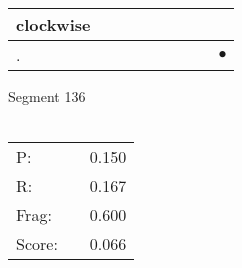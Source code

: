 \documentclass[landscape]{article}
\newcommand{\ssp}{\hspace{2pt}}
\newcommand{\mex}{\cellcolor{g}$\bullet$}
\begin{document}
\begin{tabular}{|l|p{10pt}|p{10pt}|p{10pt}|p{10pt}|p{10pt}|p{10pt}|p{10pt}|p{10pt}|}
\hline
\ssp clockwise \ssp&\hspace{2pt}&\hspace{2pt}&\hspace{2pt}&\hspace{2pt}&\hspace{2pt}&\hspace{2pt}&\hspace{2pt}&\hspace{2pt}\\
\hline
\ssp \cellcolor{ref7}. \ssp&\hspace{2pt}&\hspace{2pt}&\hspace{2pt}&\hspace{2pt}&\hspace{2pt}&\hspace{2pt}&\hspace{2pt}&\hspace{2pt}\mex\\
\hline
\end{tabular}

\vspace{6pt}
\noindent Segment 136\\\\
\noindent\begin{tabular}{lm{12pt}r}
\hline
P:&&0.150\\
R:&&0.167\\
Frag:&&0.600\\
Score:&&0.066\\
\end{tabular}

\newpage
\end{document}
